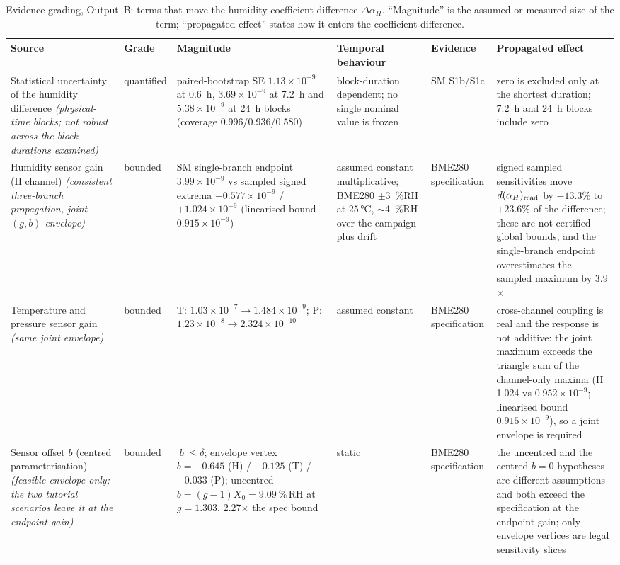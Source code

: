 \documentclass[aps,prapplied,reprint,superscriptaddress]{revtex4-2}
\begin{document}
\begin{table}[tbp]
\centering
\caption{Evidence grading, Output~B: terms that move the humidity coefficient difference $\Delta\alpha_H$. ``Magnitude'' is the assumed or measured size of the term; ``propagated effect'' states how it enters the coefficient difference.}
\label{tab:S4b}
\footnotesize
\setlength{\tabcolsep}{4pt}
\begin{tabular}{@{}p{}p{}p{}p{}p{}p{}@{}}
\hline
\textbf{Source} & \textbf{Grade} & \textbf{Magnitude} & \textbf{Temporal behaviour} & \textbf{Evidence} & \textbf{Propagated effect} \\
\hline
Statistical uncertainty of the humidity difference \emph{(physical-time blocks; not robust across the block durations examined)} & quantified & paired-bootstrap SE $1.13\times10^{-9}$ at \SI{0.6}{\hour}, $3.69\times10^{-9}$ at \SI{7.2}{\hour} and $5.38\times10^{-9}$ at \SI{24}{\hour} blocks (coverage 0.996/0.936/0.580) & block-duration dependent; no single nominal value is frozen & SM S1b/S1c & zero is excluded only at the shortest duration; \SI{7.2}{\hour} and \SI{24}{\hour} blocks include zero   \\
Humidity sensor gain (H channel) \emph{(consistent three-branch propagation, joint $(g,b)$ envelope)} & bounded & SM single-branch endpoint $3.99\times10^{-9}$ vs sampled signed extrema $-0.577\times10^{-9}$ / $+1.024\times10^{-9}$ (linearised bound $0.915\times10^{-9}$) & assumed constant multiplicative; BME280 $\pm$\SI{3}{\percent}RH at $25\,\si{\celsius}$, $\sim$\SI{4}{\percent}RH over the campaign plus drift & BME280 specification & signed sampled sensitivities move $d(\alpha_H)_{\rm read}$ by $-13.3\%$ to $+23.6\%$ of the difference; these are not certified global bounds, and the single-branch endpoint overestimates the sampled maximum by 3.9$\times$   \\
Temperature and pressure sensor gain \emph{(same joint envelope)} & bounded & T: $1.03\times10^{-7} \to 1.484\times10^{-9}$; P: $1.23\times10^{-8} \to 2.324\times10^{-10}$ & assumed constant & BME280 specification & cross-channel coupling is real and the response is not additive: the joint maximum exceeds the triangle sum of the channel-only maxima (H 1.024 vs $0.952\times10^{-9}$; linearised bound $0.915\times10^{-9}$), so a joint envelope is required  \\
Sensor offset $b$ (centred parameterisation) \emph{(feasible envelope only; the two tutorial scenarios leave it at the endpoint gain)} & bounded & $|b| \leq \delta$; envelope vertex $b = -0.645$ (H) / $-0.125$ (T) / $-0.033$ (P); uncentred $b = (g-1)X_0 = \SI{9.09}{\percent}$\,RH at $g = 1.303$, 2.27$\times$ the spec bound & static & BME280 specification & the uncentred and the centred-$b=0$ hypotheses are different assumptions and both exceed the specification at the endpoint gain; only envelope vertices are legal sensitivity slices  \\

\end{tabular}
\end{table}
\end{document}
